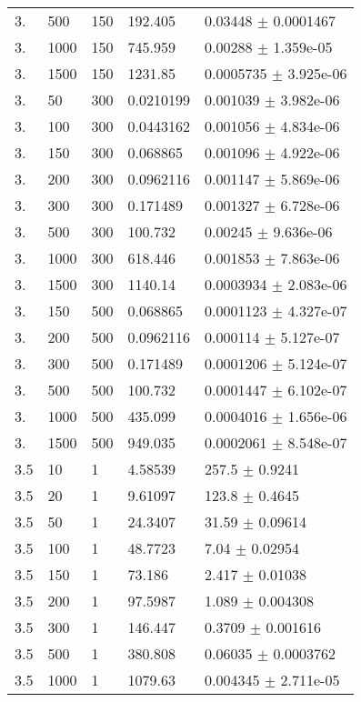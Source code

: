 \begin{longtable}{lllll}
  3. &   500 &   150 &  192.405 &  0.03448 $\pm$ 0.0001467 \\
  3. &  1000 &   150 &  745.959 &  0.00288 $\pm$ 1.359e-05 \\
  3. &  1500 &   150 &  1231.85 & 0.0005735 $\pm$ 3.925e-06 \\
  3. &    50 &   300 & 0.0210199 & 0.001039 $\pm$ 3.982e-06 \\
  3. &   100 &   300 & 0.0443162 & 0.001056 $\pm$ 4.834e-06 \\
  3. &   150 &   300 & 0.068865 & 0.001096 $\pm$ 4.922e-06 \\
  3. &   200 &   300 & 0.0962116 & 0.001147 $\pm$ 5.869e-06 \\
  3. &   300 &   300 & 0.171489 & 0.001327 $\pm$ 6.728e-06 \\
  3. &   500 &   300 &  100.732 &  0.00245 $\pm$ 9.636e-06 \\
  3. &  1000 &   300 &  618.446 & 0.001853 $\pm$ 7.863e-06 \\
  3. &  1500 &   300 &  1140.14 & 0.0003934 $\pm$ 2.083e-06 \\
  3. &   150 &   500 & 0.068865 & 0.0001123 $\pm$ 4.327e-07 \\
  3. &   200 &   500 & 0.0962116 & 0.000114 $\pm$ 5.127e-07 \\
  3. &   300 &   500 & 0.171489 & 0.0001206 $\pm$ 5.124e-07 \\
  3. &   500 &   500 &  100.732 & 0.0001447 $\pm$ 6.102e-07 \\
  3. &  1000 &   500 &  435.099 & 0.0004016 $\pm$ 1.656e-06 \\
  3. &  1500 &   500 &  949.035 & 0.0002061 $\pm$ 8.548e-07 \\
 3.5 &    10 &     1 &  4.58539 &    257.5 $\pm$   0.9241 \\
 3.5 &    20 &     1 &  9.61097 &    123.8 $\pm$   0.4645 \\
 3.5 &    50 &     1 &  24.3407 &    31.59 $\pm$  0.09614 \\
 3.5 &   100 &     1 &  48.7723 &     7.04 $\pm$  0.02954 \\
 3.5 &   150 &     1 &   73.186 &    2.417 $\pm$  0.01038 \\
 3.5 &   200 &     1 &  97.5987 &    1.089 $\pm$ 0.004308 \\
 3.5 &   300 &     1 &  146.447 &   0.3709 $\pm$ 0.001616 \\
 3.5 &   500 &     1 &  380.808 &  0.06035 $\pm$ 0.0003762 \\
 3.5 &  1000 &     1 &  1079.63 & 0.004345 $\pm$ 2.711e-05 \\

\end{longtable}
